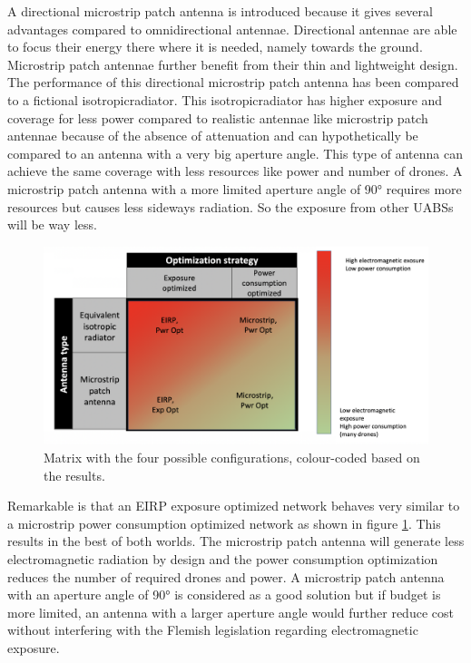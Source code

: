 A directional microstrip patch antenna is introduced because it gives several advantages compared to omnidirectional antennae.
Directional antennae are able to focus their energy there where it is needed, namely towards the ground. Microstrip patch antennae 
further benefit from their thin and lightweight design. The performance 
of this directional microstrip patch antenna has been compared to a 
fictional \gls{isotropicradiator}.
This \gls{isotropicradiator} has higher exposure and coverage for less power compared to realistic antennae like microstrip patch antennae
because of the absence of attenuation and can hypothetically be compared to an antenna with a very big aperture angle.
This type of antenna can achieve the same coverage with less
resources like power and number of drones. 
A microstrip patch antenna with a more limited aperture angle of \ang{90} requires more resources but 
causes less sideways radiation. So the exposure from other \gls{UABS}s will be way less.

\begin{figure}[hb!]
  \includegraphics[width=\textwidth]{../images/fourCasesMatrixSol.png}
  \caption{Matrix with the four possible configurations, colour-coded based on the results.}
  \label{fig:resultIllustration}
\end{figure}

Remarkable is that an \gls{EIRP} exposure optimized network behaves very similar to a microstrip power consumption optimized network as shown 
in figure \ref{fig:resultIllustration}.
This results in the best of both worlds. 
The microstrip patch antenna will generate less electromagnetic radiation by design and
 the power consumption optimization reduces the number of required drones and power. A microstrip patch antenna with an aperture 
 angle of \ang{90} is considered as a good solution but if budget is more limited, an antenna with a larger aperture angle 
 would further reduce cost without interfering with the Flemish legislation regarding electromagnetic exposure.

